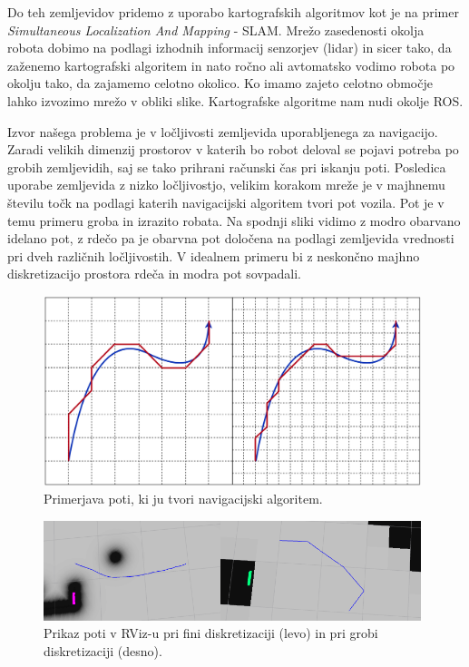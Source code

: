 Do teh zemljevidov pridemo z uporabo kartografskih algoritmov kot je na primer \textit{Simultaneous Localization And Mapping} - SLAM. Mrežo zasedenosti okolja robota dobimo na podlagi izhodnih informacij senzorjev (lidar) in sicer tako, da zaženemo kartografski algoritem in nato ročno ali avtomatsko vodimo robota po okolju tako, da zajamemo celotno okolico. Ko imamo zajeto celotno območje lahko izvozimo mrežo v obliki slike. Kartografske algoritme nam nudi okolje ROS.

Izvor našega problema je v ločljivosti zemljevida uporabljenega za navigacijo. Zaradi velikih dimenzij prostorov v katerih bo robot deloval se pojavi potreba po grobih zemljevidih, saj se tako prihrani računski čas pri iskanju poti. Posledica uporabe zemljevida z nizko ločljivostjo, velikim korakom mreže je v majhnemu številu točk na podlagi katerih navigacijski algoritem tvori pot vozila. Pot je v temu primeru groba in izrazito robata. Na spodnji sliki vidimo z modro obarvano idelano pot, z rdečo pa je obarvna pot določena na podlagi zemljevida vrednosti pri dveh različnih ločljivostih. V idealnem primeru bi z neskončno majhno diskretizacijo prostora rdeča in modra pot sovpadali.

\begin{figure}[H]
	\centering
	\includegraphics[width=11cm]{pic/pot.png}
	\caption{Primerjava poti, ki ju tvori navigacijski algoritem.}
	\label{fig:slika}
\end{figure}

\begin{figure}[H]
	\centering
	\includegraphics[width=11cm]{pic/slika3.png}
	\caption{Prikaz poti v RViz-u pri fini diskretizaciji (levo) in pri grobi diskretizaciji (desno).}
	\label{fig:slika}
\end{figure}


